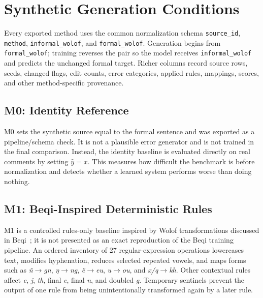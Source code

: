 \documentclass[12pt, a4paper, twoside, openany]{report}
\begin{document}
\section{Synthetic Generation Conditions}

Every exported method uses the common normalization schema \texttt{source\_id}, \texttt{method}, \texttt{informal\_wolof}, and \texttt{formal\_wolof}. Generation begins from \texttt{formal\_wolof}; training reverses the pair so the model receives \texttt{informal\_wolof} and predicts the unchanged formal target. Richer columns record source rows, seeds, changed flags, edit counts, error categories, applied rules, mappings, scores, and other method-specific provenance.


\subsection{M0: Identity Reference}

M0 sets the synthetic source equal to the formal sentence and was exported as a pipeline/schema check. It is not a plausible error generator and is not trained in the final comparison. Instead, the identity baseline is evaluated directly on real comments by setting $\hat{y}=x$. This measures how difficult the benchmark is before normalization and detects whether a learned system performs worse than doing nothing.


\subsection{M1: Beqi-Inspired Deterministic Rules}

M1 is a controlled rules-only baseline inspired by Wolof transformations discussed in Beqi~\cite{mbaye2025beqi}; it is not presented as an exact reproduction of the Beqi training pipeline. An ordered inventory of 27 regular-expression operations lowercases text, modifies hyphenation, reduces selected repeated vowels, and maps forms such as \textit{ñ}$\rightarrow$\textit{gn}, \textit{ŋ}$\rightarrow$\textit{ng}, \textit{ë}$\rightarrow$\textit{eu}, \textit{u}$\rightarrow$\textit{ou}, and \textit{x/q}$\rightarrow$\textit{kh}. Other contextual rules affect \textit{c}, \textit{j}, \textit{th}, final \textit{e}, final \textit{n}, and doubled \textit{g}. Temporary sentinels prevent the output of one rule from being unintentionally transformed again by a later rule.
\end{document}
